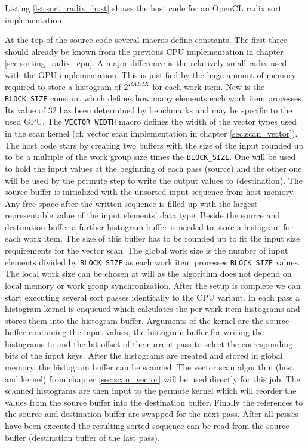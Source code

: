 \pagebreak

Listing \ref{lst:sort_radix_host} shows the host code for an OpenCL radix sort implementation.



At the top of the source code several macros define constants. The first three should already be known from the previous CPU implementation in chapter \ref{sec:sorting_radix_cpu}. A major difference is the relatively small radix used with the GPU implementation. This is justified by the huge amount of memory required to store a histogram of $2^{RADIX}$ for each work item. New is the \lstinline!BLOCK_SIZE! constant which defines how many elements each work item processes. Its value of 32 has been determined by benchmarks and may be specific to the used GPU. The \lstinline!VECTOR_WIDTH! macro defines the width of the vector types used in the scan kernel (cf. vector scan implementation in chapter \ref{sec:scan_vector}). 
The host code stars by creating two buffers with the size of the input rounded up to be a multiple of the work group size times the \lstinline!BLOCK_SIZE!. One will be used to hold the input values at the beginning of each pass (source) and the other one will be used by the permute step to write the output values to (destination). The source buffer is initialized with the unsorted input sequence from host memory. Any free space after the written sequence is filled up with the largest representable value of the input elements' data type.
Beside the source and destination buffer a further histogram buffer is needed to store a histogram for each work item. The size of this buffer has to be rounded up to fit the input size requirements for the vector scan. 
The global work size is the number of input elements divided by \lstinline!BLOCK_SIZE! as each work item processes \lstinline!BLOCK_SIZE! values. The local work size can be chosen at will as the algorithm does not depend on local memory or work group synchronization.
After the setup is complete we can start executing several sort passes identically to the CPU variant. In each pass a histogram kernel is enqueued which calculates the per work item histograms and stores them into the histogram buffer. Arguments of the kernel are the source buffer containing the input values, the histogram buffer for writing the histograms to and the bit offset of the current pass to select the corresponding bits of the input keys. After the histograms are created and stored in global memory, the histogram buffer can be scanned. The vector scan algorithm (host and kernel) from chapter \ref{sec:scan_vector} will be used directly for this job. The scanned histograms are then input to the permute kernel which will reorder the values from the source buffer into the destination buffer. Finally the references to the source and destination buffer are swapped for the next pass.
After all passes have been executed the resulting sorted sequence can be read from the source buffer (destination buffer of the last pass).

